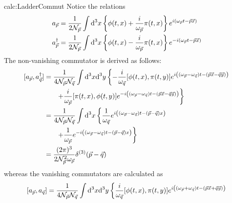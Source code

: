 \begin{calc}{calc:LadderCommut}
    Notice the relations
    \begin{subequations}
        \begin{align}
            a_{\vec{p}} & =\frac{1}{2\mathcal{N}_{\vec{p}}}\int\text{d} ^3x\left\{\phi(t,x)+\frac{{i}}{\omega_{\vec{p}}}\pi(t,x)\right\}e^{{i}(\omega_{\vec{p}}t-\vec{p}\vec{x})}  \\
            a_{\vec{p}}^\dagger       & =\frac{1}{2\mathcal{N}_{\vec{p}}}\int\text{d} ^3x\left\{\phi(t,x)-\frac{{i}}{\omega_{\vec{p}}}\pi(t,x)\right\}e^{-{i}(\omega_{\vec{p}}t-\vec{p}\vec{x})}
        \end{align}
        \label{eq:AnnCrePhiPi_Relation}
    \end{subequations}
    The non-vanishing commutator is derived as follows:
    \begin{align*}
        {[a_{\vec{p}},a_{\vec{q}}^\dagger]} & =\frac{1}{4\mathcal{N}_{\vec{p}}\mathcal{N}_{\vec{q}}}\int\text{d}^3x\text{d}^3y\left\{-\frac{{i}}{\omega_{\vec{q}}}{[\phi(t,x),\pi(t,y)]}e^{{i}\left((\omega_{\vec{p}}-\omega_{\vec{q}})t-(\vec{p}\vec{x}-\vec{q}\vec{y})\right)}\right. \\
                                                 & \phantom{=}\quad\left.                     +\frac{{i}}{\omega_{\vec{p}}}{[\pi(t,x),\phi(t,y)]}e^{-{i}\left((\omega_{\vec{p}}-\omega_{\vec{q}})t-(\vec{p}\vec{x}-\vec{q}\vec{y})\right)}\right\}                                 \\
                                                 & =\frac{1}{4\mathcal{N}_{\vec{p}}\mathcal{N}_{\vec{q}}}\int\text{d}^3x\left\{\frac{1}{\omega_{\vec{q}}}e^{{i}\left((\omega_{\vec{p}}-\omega_{\vec{q}})t-(\vec{p}-\vec{q})x\right)}\right.                                                     \\
                                                 & \phantom{=}\quad\left.                     +\frac{1}{\omega_{\vec{p}}}e^{-{i}\left((\omega_{\vec{p}}-\omega_{\vec{q}})t-(\vec{p}-\vec{q})x\right)}\right\}                                                                              \\
                                                 & =\frac{(2\pi)^3}{2\mathcal{N}_{\vec{p}}^2\omega_{\vec{p}}}\delta^{(3)}(\vec{p}-\vec{q})
    \end{align*}
    whereas the vanishing commutators are calculated as
    \begin{align*}
        \commut{a_{\vec{p}},a_{\vec{q}}} & =\frac{1}{4\mathcal{N}_{\vec{p}}\mathcal{N}_{\vec{q}}}\int\dt^3x\dt^3y\left\{\frac{\imagu}{\omega_{\vec{q}}}\commut{\phi(t,x),\pi(t,y)}e^{\imagu\left((\omega_{\vec{p}}+\omega_{\vec{q}})t-(\vec{p}\vec{x}+\vec{q}\vec{y})\right)}\right. \\

\end{align*}
\end{calc}
